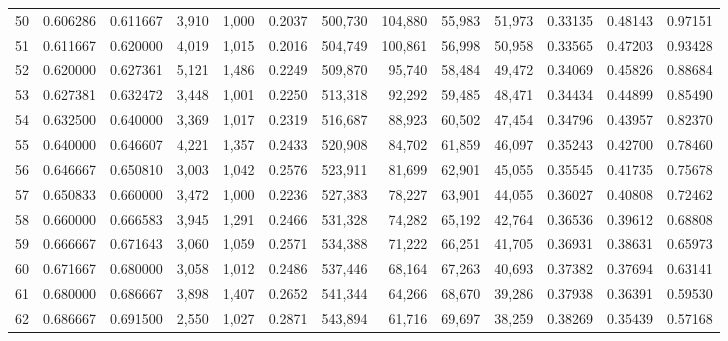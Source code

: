 \begin{tabular}{rrrrrrrrrrrrr}
50 &  0.606286 &  0.611667 &   3,910 &  1,000 &                                     0.2037 &  500,730 &  104,880 &   55,983 &   51,973 &  0.33135 &  0.48143 &  0.97151 \\
51 &  0.611667 &  0.620000 &   4,019 &  1,015 &                                     0.2016 &  504,749 &  100,861 &   56,998 &   50,958 &  0.33565 &  0.47203 &  0.93428 \\
52 &  0.620000 &  0.627361 &   5,121 &  1,486 &                                     0.2249 &  509,870 &   95,740 &   58,484 &   49,472 &  0.34069 &  0.45826 &  0.88684 \\
53 &  0.627381 &  0.632472 &   3,448 &  1,001 &                                     0.2250 &  513,318 &   92,292 &   59,485 &   48,471 &  0.34434 &  0.44899 &  0.85490 \\
54 &  0.632500 &  0.640000 &   3,369 &  1,017 &                                     0.2319 &  516,687 &   88,923 &   60,502 &   47,454 &  0.34796 &  0.43957 &  0.82370 \\
55 &  0.640000 &  0.646607 &   4,221 &  1,357 &                                     0.2433 &  520,908 &   84,702 &   61,859 &   46,097 &  0.35243 &  0.42700 &  0.78460 \\
56 &  0.646667 &  0.650810 &   3,003 &  1,042 &                                     0.2576 &  523,911 &   81,699 &   62,901 &   45,055 &  0.35545 &  0.41735 &  0.75678 \\
57 &  0.650833 &  0.660000 &   3,472 &  1,000 &                                     0.2236 &  527,383 &   78,227 &   63,901 &   44,055 &  0.36027 &  0.40808 &  0.72462 \\
58 &  0.660000 &  0.666583 &   3,945 &  1,291 &                                     0.2466 &  531,328 &   74,282 &   65,192 &   42,764 &  0.36536 &  0.39612 &  0.68808 \\
59 &  0.666667 &  0.671643 &   3,060 &  1,059 &                                     0.2571 &  534,388 &   71,222 &   66,251 &   41,705 &  0.36931 &  0.38631 &  0.65973 \\
60 &  0.671667 &  0.680000 &   3,058 &  1,012 &                                     0.2486 &  537,446 &   68,164 &   67,263 &   40,693 &  0.37382 &  0.37694 &  0.63141 \\
61 &  0.680000 &  0.686667 &   3,898 &  1,407 &                                     0.2652 &  541,344 &   64,266 &   68,670 &   39,286 &  0.37938 &  0.36391 &  0.59530 \\
62 &  0.686667 &  0.691500 &   2,550 &  1,027 &                                     0.2871 &  543,894 &   61,716 &   69,697 &   38,259 &  0.38269 &  0.35439 &  0.57168 \\

\end{tabular}
